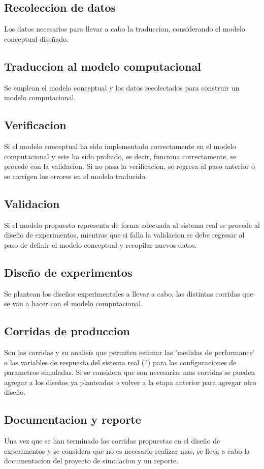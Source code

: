 \documentclass[a4paper]{article}
\begin{document}
\subsection*{Recoleccion de datos}
Los datos necesarios para llevar a cabo la traduccion, considerando el modelo conceptual diseñado.

\subsection*{Traduccion al modelo computacional}
Se emplean el modelo conceptual y los datos recolectados para construir un modelo computacional.

\subsection*{Verificacion}
Si el modelo conceptual ha sido implementado correctamente en el modelo computacional y este ha sido
probado, es decir, funciona correctamente, se procede con la validacion. Si no pasa la verificacion, 
se regresa al paso anterior o se corrigen los errores en el modelo traducido.

\subsection*{Validacion}
Si el modelo propuesto representa de forma adecuada al sistema real se procede al diseño de experimentos,
mientras que si falla la validacion se debe regresar al paso de definir el modelo conceptual y recopilar 
nuevos datos.

\subsection*{Diseño de experimentos}
Se plantean los diseños experimentales a llevar a cabo, las distintas corridas que se van a hacer 
con el modelo computacional.

\subsection*{Corridas de produccion}
Son las corridas y su analisis que permiten estimar las 'medidas de performance' o las variables de 
respuesta del sistema real (?) para las configuraciones de parametros simuladas.
Si se considera que son necesarias mas corridas se pueden agregar a los diseños ya planteados o volver 
a la etapa anterior para agregar otro diseño.

\subsection*{Documentacion y reporte}
Una vez que se han terminado las corridas propuestas en el diseño de experimentos y se considera que no
es necesario realizar mas, se lleva a cabo la documentacion del proyecto de simulacion y un reporte.
\end{document}
